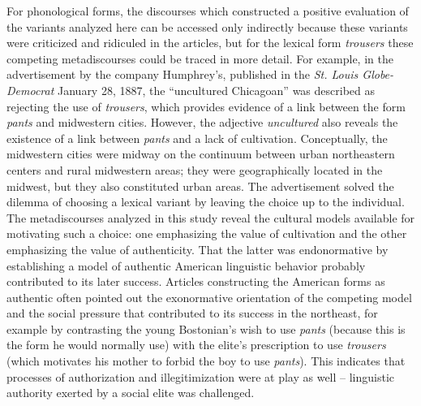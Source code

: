 For phonological forms, the discourses which constructed a positive evaluation of the variants analyzed here can be accessed only indirectly because these variants were criticized and ridiculed in the articles, but for the lexical form \emph{trousers} these competing metadiscourses could be traced in more detail. For example, in the advertisement by the company Humphrey’s, published in the \emph{St. Louis Globe-Democrat} January 28, 1887, the “uncultured Chicagoan” was described as rejecting the use of \emph{trousers}, which provides evidence of a link between the form \emph{pants} and midwestern cities. However, the adjective \emph{uncultured} also reveals the existence of a link between \emph{pants} and a lack of cultivation. Conceptually, the midwestern cities were midway on the continuum between urban northeastern centers and rural midwestern areas; they were geographically located in the midwest, but they also constituted urban areas. The advertisement solved the dilemma of choosing a lexical variant by leaving the choice up to the individual. The metadiscourses analyzed in this study reveal the cultural models available for motivating such a choice: one emphasizing the value of cultivation and the other emphasizing the value of authenticity. That the latter was endonormative by establishing a model of authentic American linguistic behavior probably contributed to its later success. Articles constructing the American forms as authentic often pointed out the exonormative orientation of the competing model and the social pressure that contributed to its success in the northeast, for example by contrasting the young Bostonian’s wish to use \emph{pants} (because this is the form he would normally use) with the elite’s prescription to use \emph{trousers} (which motivates his mother to forbid the boy to use \emph{pants}). This indicates that  processes of authorization and illegitimization were at play as well – linguistic authority exerted by a social elite was challenged.

